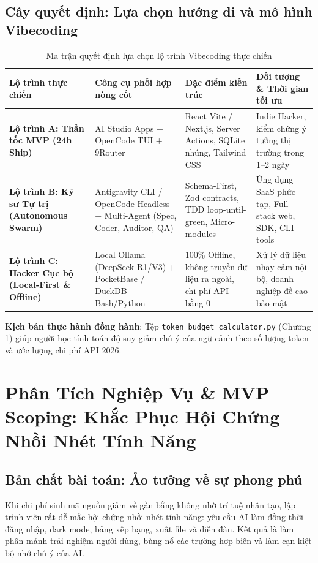 \documentclass[a4paper,11pt]{report}
\begin{document}
\section{Cây quyết định: Lựa chọn hướng đi và mô hình Vibecoding}

\begin{table}[htbp]
\centering
\small
\caption{Ma trận quyết định lựa chọn lộ trình Vibecoding thực chiến}
\vspace{0.5em}
\begin{tabularx}{\textwidth}{L{3.2cm} L{3.8cm} L{4.5cm} Y}
\toprule
\textbf{Lộ trình thực chiến} & \textbf{Công cụ phối hợp nòng cốt} & \textbf{Đặc điểm kiến trúc} & \textbf{Đối tượng \& Thời gian tối ưu} \\
\midrule
\textbf{Lộ trình A: Thần tốc MVP (24h Ship)} & AI Studio Apps + OpenCode TUI + 9Router & React Vite / Next.js, Server Actions, SQLite nhúng, Tailwind CSS & Indie Hacker, kiểm chứng ý tưởng thị trường trong 1--2 ngày \\
\textbf{Lộ trình B: Kỹ sư Tự trị (Autonomous Swarm)} & Antigravity CLI / OpenCode Headless + Multi-Agent (Spec, Coder, Auditor, QA) & Schema-First, Zod contracts, TDD loop-until-green, Micro-modules & Ứng dụng SaaS phức tạp, Full-stack web, SDK, CLI tools \\
\textbf{Lộ trình C: Hacker Cục bộ (Local-First \& Offline)} & Local Ollama (DeepSeek R1/V3) + PocketBase / DuckDB + Bash/Python & 100\% Offline, không truyền dữ liệu ra ngoài, chi phí API bằng 0 & Xử lý dữ liệu nhạy cảm nội bộ, doanh nghiệp đề cao bảo mật \\
\bottomrule
\end{tabularx}
\end{table}

\noindent\textbf{Kịch bản thực hành đồng hành}: Tệp \texttt{token\_budget\_calculator.py} (Chương 1) giúp người học tính toán độ suy giảm chú ý của ngữ cảnh theo số lượng token và ước lượng chi phí API 2026.

\chapter{Phân Tích Nghiệp Vụ \& MVP Scoping: Khắc Phục Hội Chứng Nhồi Nhét Tính Năng}

\section{Bản chất bài toán: Ảo tưởng về sự phong phú}
Khi chi phí sinh mã nguồn giảm về gần bằng không nhờ trí tuệ nhân tạo, lập trình viên rất dễ mắc hội chứng nhồi nhét tính năng: yêu cầu AI làm đồng thời đăng nhập, dark mode, bảng xếp hạng, xuất file và diễn đàn. Kết quả là làm phân mảnh trải nghiệm người dùng, bùng nổ các trường hợp biên và làm cạn kiệt bộ nhớ chú ý của AI.
\end{document}
